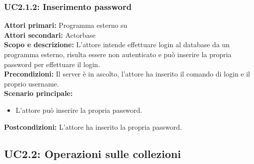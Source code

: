 \documentclass{scalatekids-article}
\begin{document}
\subsubsection{UC2.1.2: Inserimento password}

\textbf{Attori primari:} Programma esterno su \\
\textbf{Attori secondari:} Actorbase\\
\textbf{Scopo e descrizione:}
L'attore intende effettuare login al database da un programma  esterno, risulta essere non autenticato e può inserire la propria password per effettuare il login.\\
\textbf{Precondizioni:} Il server è in ascolto, l'attore ha inserito il comando di login e il proprio username.\\
\textbf{Scenario principale:}
\begin{itemize}
\item L'attore può inserire la propria password.
\end{itemize}
\textbf{Postcondizioni:} L'attore ha inserito la propria password.

\subsection{UC2.2: Operazioni sulle collezioni}
\end{document}
